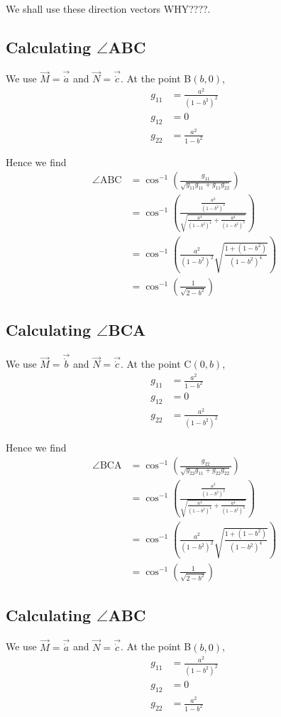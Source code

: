 \documentclass[a4paper]{article} %
\begin{document}
We shall use these direction vectors WHY????.

\subsection*{Calculating $\angle$ABC}
We use $\vec{M}=\vec{\dot{a}}$ and $\vec{N}=\vec{\dot{c}}$. At the point B$(b,0)$,
\begin{align}
g_{11}&=\frac{a^2}{(1-b^2)^2}\\
g_{12}&=0\\
g_{22}&=\frac{a^2}{1-b^2}
\end{align}

Hence we find
\begin{align}
\angle\text{ABC}&=\cos^{-1}\left(\frac{g_{11}}{\sqrt{g_{11}g_{11}+g_{11}g_{22}}}\right)\\
&=\cos^{-1}\left(\frac{\frac{a^2}{(1-b^2)^{2}}}{\sqrt{\frac{a^4}{(1-b^2)^4}+\frac{a^4}{(1-b^2)^3}}}
\right)\\
&=\cos^{-1}\left(\frac{a^2}{(1-b^2)^2}\sqrt{\frac{1+(1-b^2)}{(1-b^2)^4}}\right)\\
&=\cos^{-1}\left(\frac{1}{\sqrt{2-b^2}}\right)
\end{align}

\subsection*{Calculating $\angle$BCA}
We use $\vec{M}=\vec{\dot{b}}$ and $\vec{N}=\vec{\dot{c}}$. At the point C$(0,b)$,
\begin{align}
g_{11}&=\frac{a^2}{1-b^2}\\
g_{12}&=0\\
g_{22}&=\frac{a^2}{(1-b^2)^2}
\end{align}

Hence we find
\begin{align}
\angle\text{BCA}&=\cos^{-1}\left(\frac{g_{22}}{\sqrt{g_{22}g_{11}+g_{22}g_{22}}}\right)\\
&=\cos^{-1}\left(\frac{\frac{a^2}{(1-b^2)^{2}}}{\sqrt{\frac{a^4}{(1-b^2)^4}+\frac{a^4}{(1-b^2)^3}}}
\right)\\
&=\cos^{-1}\left(\frac{a^2}{(1-b^2)^2}\sqrt{\frac{1+(1-b^2)}{(1-b^2)^4}}\right)\\
&=\cos^{-1}\left(\frac{1}{\sqrt{2-b^2}}\right)
\end{align}

\subsection*{Calculating $\angle$ABC}
We use $\vec{M}=\vec{\dot{a}}$ and $\vec{N}=\vec{\dot{c}}$. At the point B$(b,0)$,
\begin{align}
g_{11}&=\frac{a^2}{(1-b^2)^2}\\
g_{12}&=0\\
g_{22}&=\frac{a^2}{1-b^2}
\end{align}
\end{document}
